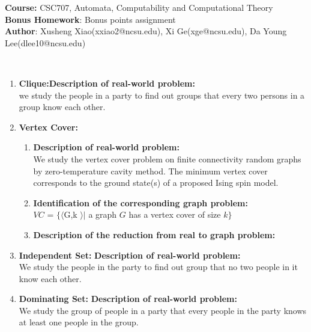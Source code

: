 \documentclass[article, 10pt,onecolumn]{article}
\begin{document}
\begin{flushleft}
\textbf{Course:} CSC707, Automata, Computability and Computational Theory\\
\textbf{Bonus Homework}: Bonus points assignment\\
\textbf{Author}: Xusheng Xiao(\small{xxiao2@ncsu.edu}), Xi Ge(\small{xge@ncsu.edu}), Da Young Lee(\small{dlee10@ncsu.edu})\\
\end{flushleft}

\begin{center}
\\
\end{center}
\noindent{\hrulefill}
\begin{enumerate}
\item \textbf{Clique:}\textbf{Description of real-world problem:}\\ 
   we study the people in a party to find out groups that every two persons in a group know each other. 
  
\item \textbf{Vertex Cover:}
  \begin{enumerate}
   \item \textbf{Description of real-world problem:}\\
    We study the vertex cover problem on finite connectivity random graphs by zero-temperature cavity method. The minimum vertex cover
    corresponds to the ground state(s) of a proposed Ising spin model.\cite{Vertex}
   \item \textbf{Identification of the corresponding graph problem:}\\
    $VC$ = $\{\langle $G,k $ \rangle | $ a graph $G$ has a vertex cover of size $k\}$ \\
   \item \textbf{Description of the reduction from real to graph problem:}\\
  \end{enumerate}

\item \textbf{Independent Set:}
 	\textbf{Description of real-world problem:} \\
   	We study the people in the party to find out group that no two people in it know each other.
  
\item \textbf{Dominating Set:} \textbf{Description of real-world problem:}\\ 
   We study the group of people in a party that every people in the party knows at least one people in the group. 
  

\end{enumerate}
\end{document}
